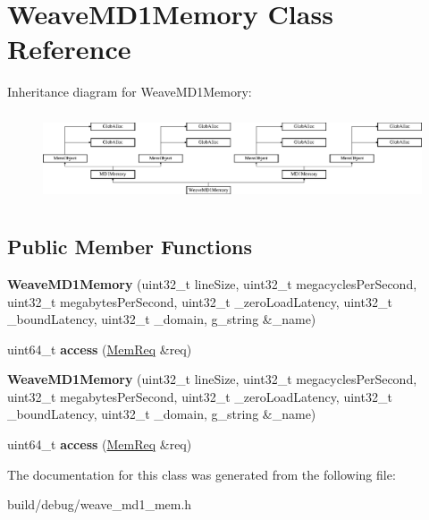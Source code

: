 \hypertarget{classWeaveMD1Memory}{\section{Weave\-M\-D1\-Memory Class Reference}
\label{classWeaveMD1Memory}
}
Inheritance diagram for Weave\-M\-D1\-Memory\-:\begin{figure}[H]
\begin{center}
\leavevmode
\includegraphics[height=2.651515cm]{classWeaveMD1Memory}
\end{center}
\end{figure}
\subsection*{Public Member Functions}
\begin{DoxyCompactItemize}
\item 
\hypertarget{classWeaveMD1Memory_a7d54394a87195d801443423d267fc492}{{\bfseries Weave\-M\-D1\-Memory} (uint32\-\_\-t line\-Size, uint32\-\_\-t megacycles\-Per\-Second, uint32\-\_\-t megabytes\-Per\-Second, uint32\-\_\-t \-\_\-zero\-Load\-Latency, uint32\-\_\-t \-\_\-bound\-Latency, uint32\-\_\-t \-\_\-domain, g\-\_\-string \&\-\_\-name)}\label{classWeaveMD1Memory_a7d54394a87195d801443423d267fc492}

\item 
\hypertarget{classWeaveMD1Memory_a10a176c26ca4380b0731006d1aa97c97}{uint64\-\_\-t {\bfseries access} (\hyperlink{structMemReq}{Mem\-Req} \&req)}\label{classWeaveMD1Memory_a10a176c26ca4380b0731006d1aa97c97}

\item 
\hypertarget{classWeaveMD1Memory_a7d54394a87195d801443423d267fc492}{{\bfseries Weave\-M\-D1\-Memory} (uint32\-\_\-t line\-Size, uint32\-\_\-t megacycles\-Per\-Second, uint32\-\_\-t megabytes\-Per\-Second, uint32\-\_\-t \-\_\-zero\-Load\-Latency, uint32\-\_\-t \-\_\-bound\-Latency, uint32\-\_\-t \-\_\-domain, g\-\_\-string \&\-\_\-name)}\label{classWeaveMD1Memory_a7d54394a87195d801443423d267fc492}

\item 
\hypertarget{classWeaveMD1Memory_a10a176c26ca4380b0731006d1aa97c97}{uint64\-\_\-t {\bfseries access} (\hyperlink{structMemReq}{Mem\-Req} \&req)}\label{classWeaveMD1Memory_a10a176c26ca4380b0731006d1aa97c97}

\end{DoxyCompactItemize}


The documentation for this class was generated from the following file\-:\begin{DoxyCompactItemize}
\item 
build/debug/weave\-\_\-md1\-\_\-mem.\-h\end{DoxyCompactItemize}
